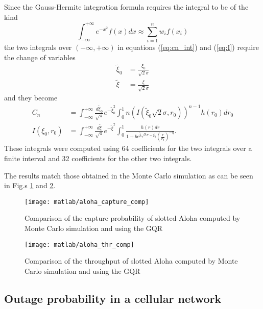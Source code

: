 \documentclass[a4paper,oneside]{article}
\begin{document}
Since the Gauss-Hermite integration formula requires the integral to
be of the kind
\begin{equation}
  \int_{-\infty}^{+\infty} e^{-x^2}f(x)dx \approx \sum_{i=1}^n w_i f(x_i)
\end{equation}
the two integrals over $(-\infty, +\infty)$ in equations
(\ref{eq:cn_int}) and (\ref{eq:I}) require the change of variables
\begin{align}
  \tilde{\xi}_0 &= \frac{\xi_0}{\sqrt{2}\sigma}
  \label{eq:sub_xi0} \\
  \tilde{\xi} &= \frac{\xi}{\sqrt{2}\sigma}
  \label{eq:sub_xi}
\end{align}
and they become
\begin{align}
  C_n &= \int_{-\infty}^{+\infty} \frac{d\tilde{\xi}_0}{\sqrt{\pi}} e^{-\tilde{\xi}_0^2}
  \int_0^1 n\left( I(\tilde{\xi}_0\sqrt{2}\sigma, r_0) \right)^{n-1} h(r_0)dr_0
  \label{eq:cn_int_sub} \\
  I(\xi_0, r_0) &= \int_{-\infty}^{+\infty} \frac{d\tilde{\xi}}{\sqrt{\pi}} e^{-\tilde{\xi}^2}
  \int_0^1 \frac{h(r)dr}{1 + be^{\tilde{\xi}\sqrt{2}\sigma - \xi_0}\left( \frac{r}{r_0} \right)^{-\eta}} .
  \label{eq:I_sub}
\end{align}
These integrals were computed using 64 coefficients for the two
integrals over a finite interval and 32 coefficients for the other two
integrals.

The results match those obtained in the Monte Carlo simulation as can
be seen in Fig.s \ref{plot:aloha_capture_comp} and
\ref{plot:aloha_thr_comp}.
\begin{figure}[htbp]
  \centering
  \texttt{[image: matlab/aloha\_capture\_comp]}
  \caption{Comparison of the capture probability of slotted Aloha
    computed by Monte Carlo simulation and using the GQR}
  \label{plot:aloha_capture_comp}
\end{figure}
\begin{figure}[htbp]
  \centering
  \texttt{[image: matlab/aloha\_thr\_comp]}
  \caption{Comparison of the throughput of slotted Aloha computed by
    Monte Carlo simulation and using the GQR}
  \label{plot:aloha_thr_comp}
\end{figure}

\subsection*{Outage probability in a cellular network}
\end{document}
